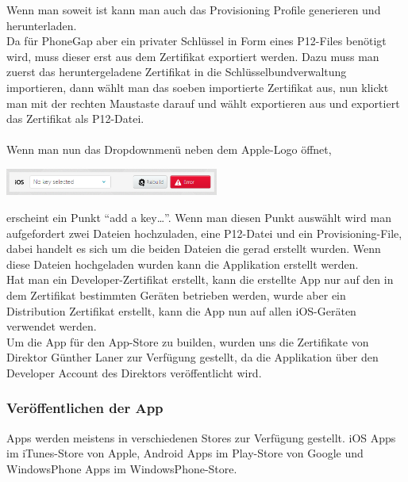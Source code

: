 Wenn man soweit ist kann man auch das Provisioning Profile generieren und herunterladen.\\
Da für PhoneGap aber ein privater Schlüssel in Form eines P12-Files benötigt wird, muss dieser erst aus dem Zertifikat exportiert werden. Dazu muss man zuerst das heruntergeladene Zertifikat in die Schlüsselbundverwaltung importieren, dann wählt man das soeben importierte Zertifikat aus, nun klickt man mit der rechten Maustaste darauf und wählt exportieren aus und exportiert das Zertifikat als P12-Datei.\\
\\
Wenn man nun das Dropdownmenü neben dem Apple-Logo öffnet,

\includegraphics[keepaspectratio=true, width=7cm]{images/phoneGap/PhoneGap4.png}

erscheint ein Punkt \enquote{add a key…}. Wenn man diesen Punkt auswählt wird man aufgefordert zwei Dateien hochzuladen, eine P12-Datei und ein Provisioning-File, dabei handelt es sich um die beiden Dateien die gerad erstellt wurden. Wenn diese Dateien hochgeladen wurden kann die Applikation erstellt werden.\\
Hat man ein Developer-Zertifikat erstellt, kann die erstellte App nur auf den in dem Zertifikat bestimmten Geräten betrieben werden, wurde aber ein Distribution Zertifikat erstellt, kann die App nun auf allen iOS-Geräten verwendet werden.\\
Um die App für den App-Store zu builden, wurden uns die Zertifikate von Direktor Günther Laner zur Verfügung gestellt, da die Applikation über den Developer Account des Direktors veröffentlicht wird.\\



\subsubsection{Veröffentlichen der App}

Apps werden meistens in verschiedenen Stores zur Verfügung gestellt. iOS Apps im iTunes-Store von Apple, Android Apps im Play-Store von Google und WindowsPhone Apps im WindowsPhone-Store.\\
